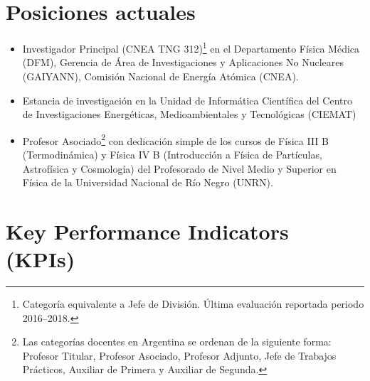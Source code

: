 \section*{Posiciones actuales}
\begin{itemize}
    \item {} Investigador Principal (CNEA TNG 312)\footnote{Categoría equivalente a Jefe de División. Última evaluación reportada periodo 2016--2018.} en el Departamento Física Médica (DFM), Gerencia de Área de Investigaciones y Aplicaciones No Nucleares (GAIYANN), Comisión Nacional de Energía Atómica (CNEA).
    \item {} Estancia de investigación en la Unidad de Informática Científica del Centro de Investigaciones Energéticas, Medioambientales y Tecnológicas (CIEMAT)
    \item {} Profesor Asociado\footnote{Las categorías docentes en Argentina se ordenan de la siguiente forma: Profesor Titular, Profesor Asociado, Profesor Adjunto, Jefe de Trabajos Prácticos, Auxiliar de Primera y Auxiliar de Segunda.} con dedicación simple de los cursos de Física III B (Termodinámica) y Física IV B (Introducción a Física de Partículas, Astrofísica y Cosmología) del Profesorado de Nivel Medio y Superior en Física de la Universidad Nacional de Río Negro (UNRN).
\end{itemize}
\fi

\ifeng
\section*{Key Performance Indicators (KPIs)}

